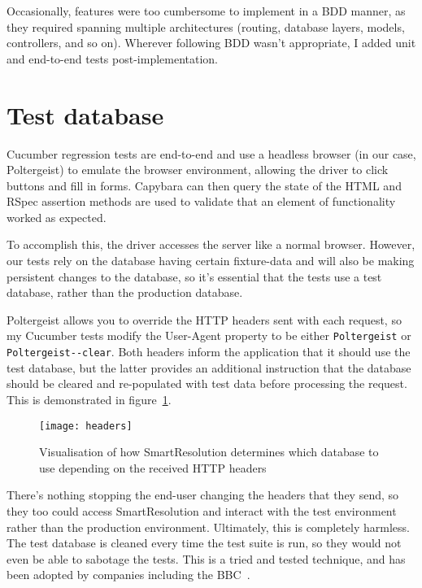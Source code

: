 Occasionally, features were too cumbersome to implement in a BDD manner, as they required spanning multiple architectures (routing, database layers, models, controllers, and so on). Wherever following BDD wasn't appropriate, I added unit and end-to-end tests post-implementation.

\section{Test database}

Cucumber regression tests are end-to-end and use a headless browser (in our case, Poltergeist) to emulate the browser environment, allowing the driver to click buttons and fill in forms. Capybara can then query the state of the HTML and RSpec assertion methods are used to validate that an element of functionality worked as expected.

To accomplish this, the driver accesses the server like a normal browser. However, our tests rely on the database having certain fixture-data and will also be making persistent changes to the database, so it's essential that the tests use a test database, rather than the production database.

Poltergeist allows you to override the HTTP headers sent with each request, so my Cucumber tests modify the User-Agent property to be either \lstinline{Poltergeist} or \lstinline{Poltergeist--clear}. Both headers inform the application that it should use the test database, but the latter provides an additional instruction that the database should be cleared and re-populated with test data before processing the request. This is demonstrated in figure~\ref{uml:headers}.

\begin{figure}[h!]
  \centering
    \ifimages
    \texttt{[image: headers]}
    \fi
  \caption{Visualisation of how SmartResolution determines which database to use depending on the received HTTP headers}
  \label{uml:headers}
\end{figure}

There's nothing stopping the end-user changing the headers that they send, so they too could access SmartResolution and interact with the test environment rather than the production environment. Ultimately, this is completely harmless. The test database is cleaned every time the test suite is run, so they would not even be able to sabotage the tests. This is a tried and tested technique, and has been adopted by companies including the BBC~\cite{bbc:cucumber}.

